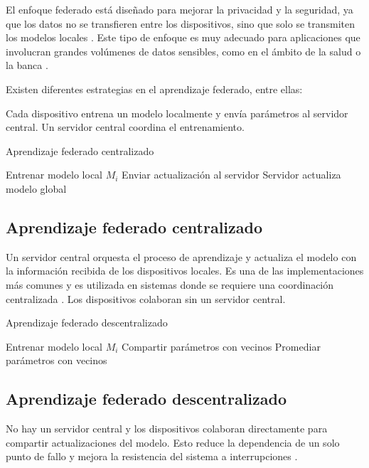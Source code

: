 El enfoque federado está diseñado para mejorar la privacidad y la seguridad, ya que los datos no se transfieren entre los dispositivos, sino que solo se transmiten los modelos locales \cite{bonawitz2019towards}. Este tipo de enfoque es muy adecuado para aplicaciones que involucran grandes volúmenes de datos sensibles, como en el ámbito de la salud o la banca \cite{yang2019federated}.

Existen diferentes estrategias en el aprendizaje federado, entre ellas:

Cada dispositivo entrena un modelo localmente y envía parámetros al servidor central.
Un servidor central coordina el entrenamiento.

\begin{algorithm}
	\caption{Aprendizaje federado centralizado}
	\begin{algorithmic}[1]
		\State Entrenar modelo local $M_i$
		\State Enviar actualización al servidor
		\EndFor
		\State Servidor actualiza modelo global
		\EndFor
	\end{algorithmic}
\end{algorithm}
\subsection{Aprendizaje federado centralizado}
Un servidor central orquesta el proceso de aprendizaje y actualiza el modelo con la información recibida de los dispositivos locales. Es una de las implementaciones más comunes y es utilizada en sistemas donde se requiere una coordinación centralizada \cite{mcmahan2017communication}.
Los dispositivos colaboran sin un servidor central.

\begin{algorithm}
	\caption{Aprendizaje federado descentralizado}
	\begin{algorithmic}[1]
		\State Entrenar modelo local $M_i$
		\State Compartir parámetros con vecinos
		\State Promediar parámetros con vecinos
		\EndFor
	\end{algorithmic}
\end{algorithm}
\subsection{Aprendizaje federado descentralizado}
No hay un servidor central y los dispositivos colaboran directamente para compartir actualizaciones del modelo. Esto reduce la dependencia de un solo punto de fallo y mejora la resistencia del sistema a interrupciones \cite{li2020federated}.

